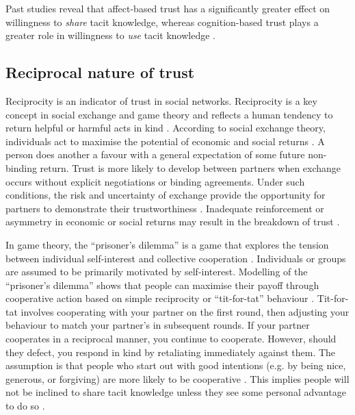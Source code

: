 Past studies reveal that affect\hyp{}based trust has a significantly greater effect on willingness to \textit{share} tacit knowledge, whereas cognition-based trust plays a greater role in willingness to \textit{use} tacit knowledge \citep{levin2004strength,holste2010trust,ding2015research}. 

\subsection{Reciprocal nature of trust}

Reciprocity is an indicator of trust in social networks. Reciprocity is a key concept in social exchange and game theory and reflects a human tendency to return helpful or harmful acts in kind \citep{nowak2005evolution}. According to social exchange theory, individuals act to maximise the potential of economic and social returns \citep{homans1961social,blau1964exchange}. A person does another a favour with a general expectation of some future non-binding return. Trust is more likely to develop between partners when exchange occurs without explicit negotiations or binding agreements. Under such conditions, the risk and uncertainty of exchange provide the opportunity for partners to demonstrate their trustworthiness \citep{molm2000risk}. Inadequate reinforcement or asymmetry in economic or social returns may result in the breakdown of trust \citep{homans1961social}. \medskip

In game theory, the \enquote{prisoner’s dilemma} is a game that explores the tension between individual self-interest and collective cooperation \citep{richards2001reciprocity}. Individuals or groups are assumed to be primarily motivated by self-interest. Modelling of the \enquote{prisoner's dilemma} shows that people can maximise their payoff through cooperative action based on simple reciprocity or \enquote{tit-for-tat} behaviour \citep{axelrod1980effective,axelrod1981evolution}. Tit-for-tat involves cooperating with your partner on the first round, then adjusting your behaviour to match your partner’s in subsequent rounds. If your partner cooperates in a reciprocal manner, you continue to cooperate. However, should they defect, you respond in kind by retaliating immediately against them. The assumption is that people who start out with good intentions (e.g. by being nice, generous, or forgiving) are more likely to be cooperative \citep{blais1987epistemic,richards2001reciprocity,fulmer2013trust}. This implies people will not be inclined to share tacit knowledge unless they see some personal advantage to do so \citep{yang2006knowledge,singh2019territoriality}. 

